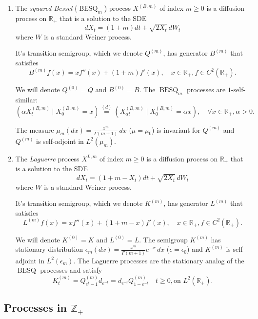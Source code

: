 \documentclass[11pt,a4,reqno]{amsart}
\numberwithin{equation}{section}
\theoremstyle{definition}
\theoremstyle{remark}
\newcommand{\bb}[1]{\mathbb{#1}}
\newcommand{\R}{\bb{R}}
\newcommand{\Z}{\bb{Z}}
\DeclareMathOperator{\besq}{BESQ}
\newcommand{\beq}{\begin{equation}}
\newcommand{\eeq}{\end{equation}}
\begin{document}
	\begin{enumerate}
	
		\item The \textit{squared Bessel} ($\besq_m$) process $X^{(B, m)}$ of index $m \geq 0$ is a diffusion process on $\R_+$ that is a solution to the SDE
		\beq dX_t = (1 + m) dt + \sqrt{2X_t} \, dW_t \eeq
		where $W$ is a standard Weiner process. 
		
		It's transition semigroup, which we denote $Q^{(m)}$, has generator $B^{(m)}$ that satisfies
		\beq B^{(m)}f(x) = x f''(x) + (1 + m) f'(x), \quad x \in \R_+, f \in C^2(\R_+). \eeq
		
		We will denote $Q^{(0)} = Q$ and $B^{(0)} = B$. The $\besq_m$ processes are $1$-self-similar:
		\beq \label{eqn:self_similar_besq} ( \alpha X_t^{(B, m)} \mid X_0^{(B, m)} = x) \overset{(d)}{=} (X_{\alpha t}^{(B, m)} \mid X_0^{(B, m)} = \alpha x), \quad \forall x \in \R_+, \alpha > 0 . \eeq
		
		The measure $\mu_m(dx) = \frac{x^m}{\Gamma(m + 1)} \, dx$ ($\mu = \mu_0$) is invariant for $Q^{(m)}$ and $Q^{(m)}$ is self-adjoint in $L^2(\mu_m)$.
		
		\item The \textit{Laguerre} process $X^{L, m}$ of index $m \geq 0$ is a diffusion process on $\R_+$ that is a solution to the SDE 
		\beq dX_t = (1 + m - X_t) dt + \sqrt{2X_t} \, dW_t \eeq
		where $W$ is a standard Weiner process. 
		
		It's transition semigroup, which we denote $K^{(m)}$, has generator $L^{(m)}$ that satisfies
		\beq L^{(m)}f(x) = x f''(x) + (1 + m - x) f'(x), \quad x \in \R_+, f \in C^2(\R_+). \eeq
		
		We will denote $K^{(0)} = K$ and $L^{(0)} = L$. The semigroup $K^{(m)}$ has stationary distribution $\epsilon_m(dx) = \frac{x^m}{\Gamma(m + 1)} e^{-x} \, dx$ ($\epsilon = \epsilon_0$) and $K^{(m)}$ is self-adjoint in $L^2(\epsilon_m)$. The Laguerre processes are the stationary analog of the $\besq$ processes and satisfy 
		\beq \label{eqn:besq_lag} K^{(m)}_t = Q_{e^t - 1}^{(m)} d_{e^{-t}} = d_{e^{-t}} Q_{1 - e^{-t}}^{(m)} \quad t \geq 0, \text{on } L^2(\R_+) . \eeq
		
	\end{enumerate}
	
	
\subsection{Processes in $\Z_+$}
\end{document}

